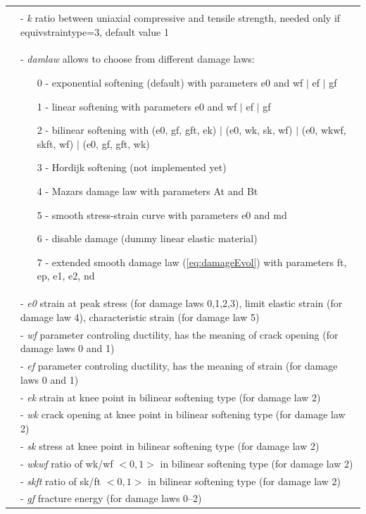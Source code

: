 \documentclass[a4paper]{article}
\newcommand{\param}[1]{{\it #1}}
\begin{document}
\begin{longtable}{|l|p{9cm}|}
\begin{itemize}
\end{itemize}\\
&- \param{k} ratio between uniaxial compressive and tensile strength, needed only if equivstraintype=3, default value 1\\
&- \param{damlaw} allows to choose from different damage laws:
\begin{itemize}\setlength{\itemsep}{-3pt}
\item[0 -] exponential softening (default) with parameters e0 and wf $\vert$ ef $\vert$ gf
\item[1 -] linear softening with parameters e0 and wf $\vert$ ef $\vert$ gf
\item[2 -] bilinear softening with (e0, gf, gft, ek) $\vert$ (e0, wk, sk, wf) $\vert$ (e0, wkwf, skft, wf) $\vert$ (e0, gf, gft, wk)
\item[3 -] Hordijk softening (not implemented yet)
\item[4 -] Mazars damage law with parameters At and Bt
\item[5 -] smooth stress-strain curve with parameters e0 and md
\item[6 -] disable damage (dummy linear elastic material)
\item[7 -] extended smooth damage law (\ref{eq:damageEvol}) with parameters ft, ep, e1, e2, nd
\end{itemize}\\
&- \param{e0} strain at peak stress (for damage laws 0,1,2,3), limit elastic strain (for damage law 4), characteristic strain (for damage law 5)\\
&- \param{wf} parameter controling ductility, has the meaning of crack opening (for damage laws 0 and 1)\\
&- \param{ef} parameter controling ductility, has the meaning of strain (for damage laws 0 and 1)\\
&- \param{ek} strain at knee point in bilinear softening type (for damage law 2)\\
&- \param{wk} crack opening at knee point in bilinear softening type (for damage law 2)\\
&- \param{sk} stress at knee point in bilinear softening type (for damage law 2)\\
&- \param{wkwf} ratio of wk/wf $<0,1>$ in bilinear softening type (for damage law 2)\\
&- \param{skft} ratio of sk/ft $<0,1>$ in bilinear softening type (for damage law 2)\\
&- \param{gf} fracture energy (for damage laws 0--2)\\

\end{longtable}
\end{document}

